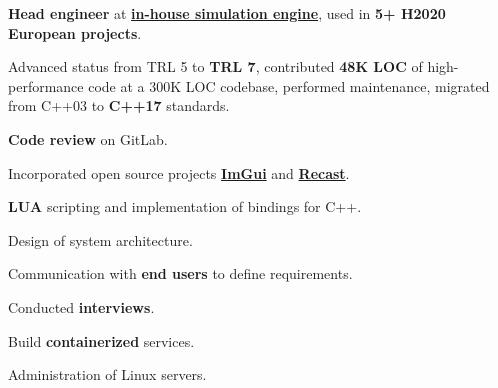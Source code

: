 \documentclass[]{deedy-resume-openfont}
\begin{document}
\begin{minipage}[t]{0.66\textwidth}
\vspace{\topsep} %
\begin{tightemize}
\item \textbf{Head engineer} at \textbf{\href{https://ui.adsabs.harvard.edu/abs/2016SPIE.9842E..0QK/abstract}{in-house simulation engine}}, used in \textbf{5+ H2020 European projects}.
\item Advanced status from TRL 5 to \textbf{TRL 7}, contributed \textbf{48K LOC} of
    high-performance code at a 300K LOC codebase, performed maintenance,
    migrated from
C++03 to \textbf{C++17} standards.
\item \textbf{Code review} on GitLab.
\item Incorporated open source projects \textbf{\href{https://github.com/ocornut/imgui}{ImGui}} and \textbf{\href{https://github.com/recastnavigation/recastnavigation}{Recast}}.
\item \textbf{LUA} scripting and implementation of bindings for C++.
\item Design of system architecture.
\item Communication with \textbf{end users} to define requirements.
\item Conducted \textbf{interviews}.
\item Build \textbf{containerized} services.
\item Administration of Linux servers.
\end {tightemize}
\sectionsep






\end{minipage}
\end{document}
